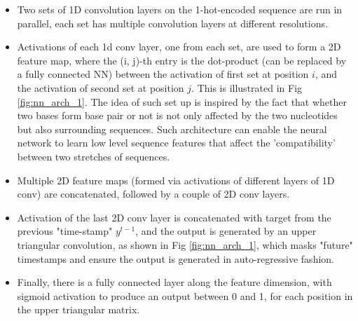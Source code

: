 \documentclass{article}
\begin{document}
\begin{itemize}

    \item Two sets of 1D convolution layers on the 1-hot-encoded sequence are run in parallel,
     each set has multiple convolution layers at different resolutions.

    \item Activations of each 1d conv layer, one from each set, are used to form a 2D feature map,
where the (i, j)-th entry is the dot-product (can be replaced by a fully connected NN) between the
activation of first set at position $i$, and the activation of second set at position $j$.
This is illustrated in Fig \ref{fig:nn_arch_1}.
The idea of such set up is inspired by the fact that whether two bases form base pair or not
is not only affected by the two nucleotides but also surrounding sequences.
Such architecture can enable the neural network to learn low level sequence features that affect the 'compatibility'
between two stretches of sequences.

    \item Multiple 2D feature maps (formed via activations of different layers of 1D conv) are concatenated,
followed by a couple of 2D conv layers.



    \item  Activation of the last 2D conv layer is concatenated with target from the previous "time-stamp" $y^{t-1}$,
and the output is generated by an upper triangular convolution, as shown in Fig \ref{fig:nn_arch_1},
which masks "future" timestamps and ensure the output is generated in auto-regressive fashion.

    \item Finally, there is a fully connected layer along the feature dimension,
   with sigmoid activation to produce an output between 0 and 1,
    for each position in the upper triangular matrix.

\end{itemize}
\end{document}
